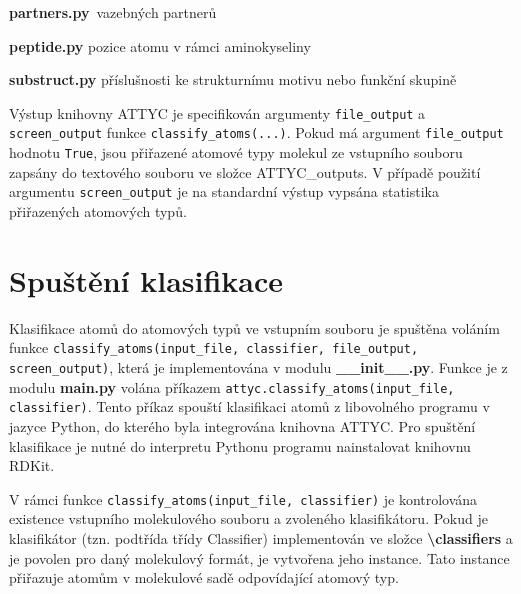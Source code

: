 \vspace{0.01cm}
\textbf{partners.py}\ vazebných partnerů

\vspace{0.01cm}
\textbf{peptide.py} pozice atomu v rámci aminokyseliny
    
\vspace{0.01cm}
\textbf{substruct.py} příslušnosti ke strukturnímu motivu nebo funkční skupině

\bigskip
Výstup knihovny ATTYC je specifikován argumenty \verb|file_output| a \verb|screen_output| funkce \verb|classify_atoms(...)|. Pokud má argument \verb|file_output| hodnotu \verb|True|, jsou přiřazené atomové typy molekul ze vstupního souboru zapsány do textového souboru ve složce ATTYC\_outputs. V případě použití argumentu \verb|screen_output| je na standardní výstup vypsána statistika přiřazených atomových typů.


\section{Spuštění klasifikace}
Klasifikace atomů do atomových typů ve vstupním souboru je spuštěna voláním fun\-kce \verb|classify_atoms(input_file, classifier, file_output, screen_output)|, která je 
implementována v modulu \textbf{\_\_init\_\_.py}. Funkce je z modulu \textbf{main.py} volána příkazem \verb|attyc.classify_atoms(input_file, classifier)|. Tento příkaz spouští klasifikaci atomů z libovolného programu v jazyce Python, do kterého byla integrována knihovna ATTYC. Pro spuštění klasifikace je nutné do interpretu Pythonu programu nainstalovat knihovnu RDKit. 

V rámci funkce \verb|classify_atoms(input_file, classifier)| je kontrolována e\-xistence vstupního molekulového souboru a zvoleného klasifikátoru. Pokud je klasifikátor (tzn. podtřída třídy Classifier) implementován ve složce \textbf{\textbackslash classifiers} a je povolen pro daný molekulový formát, je vytvořena jeho instance. Tato instance přiřazuje atomům v molekulové sadě odpovídající atomový typ.


